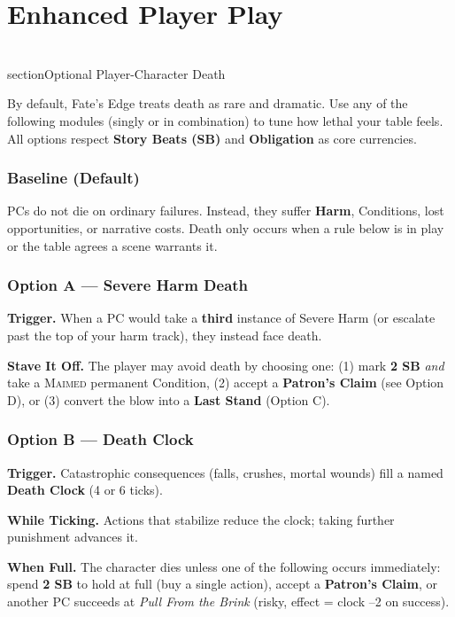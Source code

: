 \chapter{Enhanced Player Play}
\label{ch:enhanced-play}


\\section{Optional Player-Character Death}\label{sec:pc-death-optional}

By default, Fate's Edge treats death as rare and dramatic. Use any of the following modules (singly or in combination) to tune how lethal your table feels. All options respect \textbf{Story Beats (SB)} and \textbf{Obligation} as core currencies.

\subsection*{Baseline (Default)}\label{subsec:death-baseline}
PCs do not die on ordinary failures. Instead, they suffer \textbf{Harm}, Conditions, lost opportunities, or narrative costs. Death only occurs when a rule below is in play or the table agrees a scene warrants it.

\subsection*{Option A — Severe Harm Death}\label{subsec:death-severe}
\textbf{Trigger.} When a PC would take a \textbf{third} instance of Severe Harm (or escalate past the top of your harm track), they instead face death.\par
\textbf{Stave It Off.} The player may avoid death by choosing one: (1) mark \textbf{2 SB} \emph{and} take a \textsc{Maimed} permanent Condition, (2) accept a \textbf{Patron's Claim} (see Option D), or (3) convert the blow into a \textbf{Last Stand} (Option C).

\subsection*{Option B — Death Clock}\label{subsec:death-clock}
\textbf{Trigger.} Catastrophic consequences (falls, crushes, mortal wounds) fill a named \textbf{Death Clock} (4 or 6 ticks).\par
\textbf{While Ticking.} Actions that stabilize reduce the clock; taking further punishment advances it.\par
\textbf{When Full.} The character dies unless one of the following occurs immediately: spend \textbf{2 SB} to hold at full (buy a single action), accept a \textbf{Patron's Claim}, or another PC succeeds at \emph{Pull From the Brink} (risky, effect = clock –2 on success).

